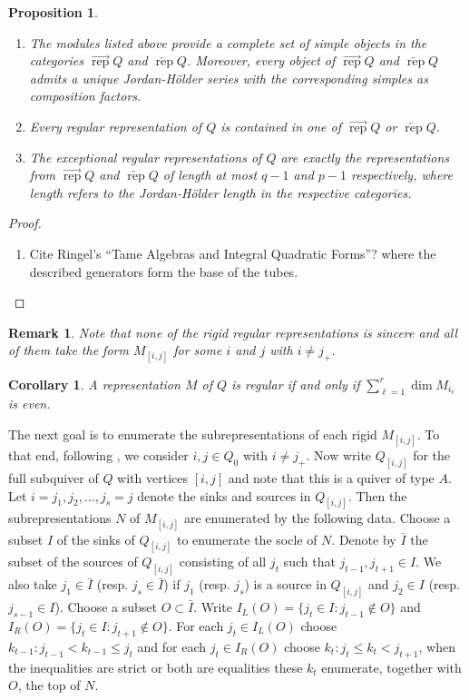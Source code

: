 \documentclass[12pt]{amsart}
\newcommand{\rep}{\operatorname{rep}}
\newtheorem{corollary}[theorem]{Corollary}
\newtheorem{proposition}[theorem]{Proposition}
\newtheorem{remark}[theorem]{Remark}
\numberwithin{equation}{section}
\begin{document}
  \begin{proposition}\mbox{}
    \begin{enumerate}
      \item The modules listed above provide a complete set of simple objects in the categories $\overrightarrow{\rep}Q$ and $\overleftarrow{\rep}Q$.  Moreover, every object of $\overrightarrow{\rep}Q$ and $\overleftarrow{\rep}Q$ admits a unique Jordan-H\"older series with the corresponding simples as composition factors.
      \item Every regular representation of $Q$ is contained in one of $\overrightarrow{\rep}Q$ or $\overleftarrow{\rep}Q$.
      \item The exceptional regular representations of $Q$ are exactly the representations from $\overrightarrow{\rep}Q$ and $\overleftarrow{\rep}Q$ of length at most $q-1$ and $p-1$ respectively, where length refers to the Jordan-H\"older length in the respective categories.  
    \end{enumerate}
  \end{proposition}
  \begin{proof}
    \begin{enumerate}
      \item Cite Ringel's ``Tame Algebras and Integral Quadratic Forms''?  \cite[Theorem 3.6.5]{Rin84} where the described generators form the base of the tubes.
    \end{enumerate}
  \end{proof}
  \begin{remark}\label{rem:rigid regulars}
    Note that none of the rigid regular representations is sincere and all of them take the form $M_{[i,j]}$ for some $i$ and $j$ with $i\ne j_+$.
  \end{remark}

  \begin{corollary}
    A representation $M$ of $Q$ is regular if and only if $\sum\limits_{\ell=1}^r\dim M_{i_\ell}$ is even.
  \end{corollary}

  The next goal is to enumerate the subrepresentations of each rigid $M_{[i,j]}$.  To that end, following , we consider $i,j\in Q_0$ with $i\ne j_+$.  Now write $Q_{[i,j]}$ for the full subquiver of $Q$ with vertices $[i,j]$ and note that this is a quiver of type $A$.  Let $i=j_1,j_2,\ldots,j_s=j$ denote the sinks and sources in $Q_{[i,j]}$.  Then the subrepresentations $N$ of $M_{[i,j]}$ are enumerated by the following data.  Choose a subset $I$ of the sinks of $Q_{[i,j]}$ to enumerate the socle of $N$.  Denote by $\bar{I}$ the subset of the sources of $Q_{[i,j]}$ consisting of all $j_t$ such that $j_{t-1},j_{t+1}\in I$.  We also take $j_1\in\bar{I}$ (resp. $j_s\in\bar{I}$) if $j_1$ (resp. $j_s$) is a source in $Q_{[i,j]}$ and $j_2\in I$ (resp. $j_{s-1}\in I$).  Choose a subset $O\subset\bar{I}$.  Write $I_L(O)=\{j_t\in I:j_{t-1}\notin O\}$ and $I_R(O)=\{j_t\in I:j_{t+1}\notin O\}$.  For each $j_t\in I_L(O)$ choose $k_{t-1}:j_{t-1}<k_{t-1}\le j_t$ and for each $j_t\in I_R(O)$ choose $k_t:j_t\le k_t<j_{t+1}$, when the inequalities are strict or both are equalities these $k_t$ enumerate, together with $O$, the top of $N$.
\end{document}
